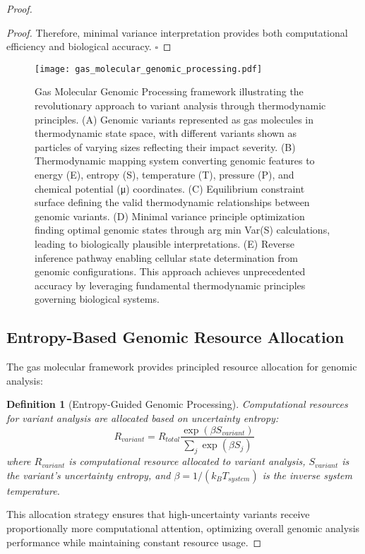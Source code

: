 \documentclass[12pt,a4paper]{article}
\newtheorem{definition}[theorem]{Definition}
\begin{document}
\begin{proof}
\begin{proof}
Therefore, minimal variance interpretation provides both computational efficiency and biological accuracy. $\square$
\end{proof}

\begin{figure}[H]
\centering
\texttt{[image: gas\_molecular\_genomic\_processing.pdf]}
\caption{Gas Molecular Genomic Processing framework illustrating the revolutionary approach to variant analysis through thermodynamic principles. (A) Genomic variants represented as gas molecules in thermodynamic state space, with different variants shown as particles of varying sizes reflecting their impact severity. (B) Thermodynamic mapping system converting genomic features to energy (E), entropy (S), temperature (T), pressure (P), and chemical potential (μ) coordinates. (C) Equilibrium constraint surface defining the valid thermodynamic relationships between genomic variants. (D) Minimal variance principle optimization finding optimal genomic states through arg min Var(S) calculations, leading to biologically plausible interpretations. (E) Reverse inference pathway enabling cellular state determination from genomic configurations. This approach achieves unprecedented accuracy by leveraging fundamental thermodynamic principles governing biological systems.}
\label{fig:gas-molecular-processing}
\end{figure}

\subsection{Entropy-Based Genomic Resource Allocation}

The gas molecular framework provides principled resource allocation for genomic analysis:

\begin{definition}[Entropy-Guided Genomic Processing]
Computational resources for variant analysis are allocated based on uncertainty entropy:
$$R_{variant} = R_{total} \frac{\exp(\beta S_{variant})}{\sum_{j} \exp(\beta S_j)}$$
where $R_{variant}$ is computational resource allocated to variant analysis, $S_{variant}$ is the variant's uncertainty entropy, and $\beta = 1/(k_B T_{system})$ is the inverse system temperature.
\end{definition}

This allocation strategy ensures that high-uncertainty variants receive proportionally more computational attention, optimizing overall genomic analysis performance while maintaining constant resource usage.


\end{proof}
\end{document}
